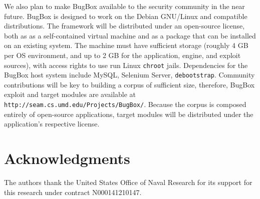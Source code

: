 \documentclass[letterpaper,twocolumn,10pt]{article}
\begin{document}
We also plan to make BugBox available to the security community in the near future. BugBox is designed to work on the Debian GNU/Linux and compatible distributions.  The framework will be distributed under an open-source license, both as as a self-contained virtual machine and as a package that can be installed on an existing system. The machine must have sufficient storage (roughly 4 GB per OS environment, and up to 2 GB for the application, engine, and exploit sources), with access rights to use run Linux {\tt chroot} jails.  Dependencies for the BugBox host system include MySQL, Selenium Server, \texttt{debootstrap}. Community contributions will be key to building a corpus of sufficient size, therefore, BugBox exploit and target modules are available at {\tt http://seam.cs.umd.edu/Projects/BugBox/}. Because the corpus is composed entirely of open-source applications, target modules will be distributed under the application's respective license.

\section*{Acknowledgments}

The authors thank the United States Office of Naval Research for its support for this research under contract N000141210147.

{\footnotesize 
}
\end{document}
